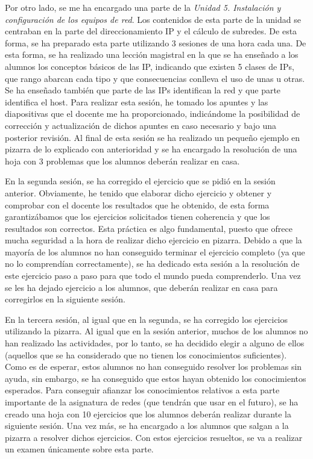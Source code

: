 \documentclass[spanish,12pt, a4paper,twoside]{paper}
\begin{document}
Por otro lado, se me ha encargado una parte de la \textit{Unidad 5. Instalación y configuración de los equipos de red}. Los contenidos de esta parte de la unidad se centraban en la parte del direccionamiento IP y el cálculo de subredes. De esta forma, se ha preparado esta parte utilizando 3 sesiones de una hora cada una. De esta forma, se ha realizado una lección magistral en la que se ha enseñado a los alumnos los conceptos básicos de las IP, indicando que existen 5 clases de IPs, que rango abarcan cada tipo y que consecuencias conlleva el uso de unas u otras. Se ha enseñado también que parte de las IPs identifican la red y que parte identifica el host. Para realizar esta sesión, he tomado los apuntes y las diapositivas que el docente me ha proporcionado, indicándome la posibilidad de corrección y actualización de dichos apuntes en caso necesario y bajo una posterior revisión. Al final de esta sesión se ha realizado un pequeño ejemplo en pizarra de lo explicado con anterioridad y se ha encargado la resolución de una hoja con 3 problemas que los alumnos deberán realizar en casa.

En la segunda sesión, se ha corregido el ejercicio que se pidió en la sesión anterior. Obviamente, he tenido que elaborar dicho ejercicio y obtener y comprobar con el docente los resultados que he obtenido, de esta forma garantizábamos que los ejercicios solicitados tienen coherencia y que los resultados son correctos. Esta práctica es algo fundamental, puesto que ofrece mucha seguridad a la hora de realizar dicho ejercicio en pizarra. Debido a que la mayoría de los alumnos no han conseguido terminar el ejercicio completo (ya que no lo comprendían correctamente), se ha dedicado esta sesión a la resolución de este ejercicio paso a paso para que todo el mundo pueda comprenderlo. Una vez se les ha dejado ejercicio a los alumnos, que deberán realizar en casa para corregirlos en la siguiente sesión.

En la tercera sesión, al igual que en la segunda, se ha corregido los ejercicios utilizando la pizarra. Al igual que en la sesión anterior, muchos de los alumnos no han realizado las actividades, por lo tanto, se ha decidido elegir a alguno de ellos (aquellos que se ha considerado que no tienen los conocimientos suficientes). Como es de esperar, estos alumnos no han conseguido resolver los problemas sin ayuda, sin embargo, se ha conseguido que estos hayan obtenido los conocimientos esperados. Para conseguir afianzar los conocimientos relativos a esta parte importante de la asignatura de redes (que tendrán que usar en el futuro), se ha creado una hoja con 10 ejercicios que los alumnos deberán realizar durante la siguiente sesión. Una vez más, se ha encargado a los alumnos que salgan a la pizarra a resolver dichos ejercicios. Con estos ejercicios resueltos, se va a realizar un examen únicamente sobre esta parte.
\end{document}
